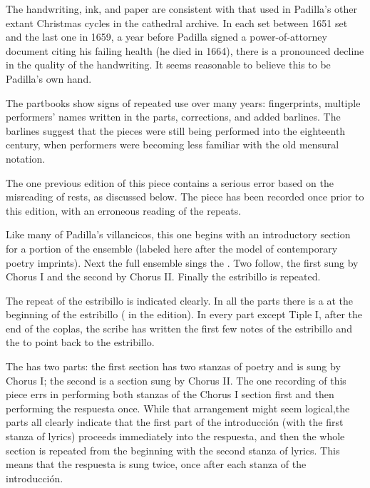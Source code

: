 The handwriting, ink, and paper are consistent with that used in Padilla's other extant Christmas cycles in the cathedral archive.
In each set between 1651 set and the last one in 1659, a year before Padilla signed a power-of-attorney document citing his failing health\autocite{Mauleon:PadillaCivil} (he died in 1664), there is a pronounced decline in the quality of the handwriting.
It seems reasonable to believe this to be Padilla's own hand.

The partbooks show signs of repeated use over many years: fingerprints, multiple performers' names written in the parts, corrections, and added barlines.
The barlines suggest that the pieces were still being performed into the eighteenth century, when performers were becoming less familiar with the old mensural notation.

The one previous edition of this piece contains a serious error based on the misreading of rests, as discussed below.
The piece has been recorded once prior to this edition, with an erroneous reading of the repeats.%
  \autocite{Padilla:HabanaCD}


Like many of Padilla's villancicos, this one begins with an introductory section for a portion of the ensemble (labeled here  after the model of contemporary poetry imprints).
Next the full ensemble sings the .
Two  follow, the first sung by Chorus I and the second by Chorus II. 
Finally the estribillo is repeated.

The repeat of the estribillo is indicated clearly.
In all the parts there is a  at the beginning of the estribillo ( in the edition).
In every part except Tiple I, after the end of the coplas, the scribe has written the first few notes of the estribillo and the  to point back to the estribillo.

The  has two parts: the first section has two stanzas of poetry and is sung by Chorus I; the second is a  section sung by Chorus II.
The one recording of this piece errs in performing both stanzas of the Chorus I section first and then performing the respuesta once.
While that arrangement might seem logical,the parts all clearly indicate that the first part of the introducción (with the first stanza of lyrics) proceeds immediately into the respuesta, and then the whole section is repeated from the beginning with the second stanza of lyrics.
This means that the respuesta is sung twice, once after each stanza of the introducción.

